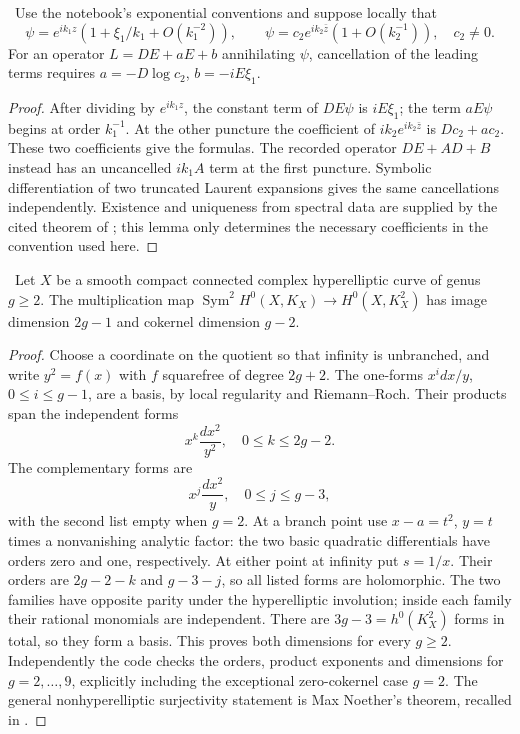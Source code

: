 \begin{lemma}\ours\
Use the notebook's exponential conventions and suppose locally that
\[
 \psi=e^{ik_1z}(1+\xi_1/k_1+O(k_1^{-2})),\qquad
 \psi=c_2e^{ik_2\bar z}(1+O(k_2^{-1})),\quad c_2\ne0.
\]
For an operator \(L=DE+aE+b\) annihilating \(\psi\), cancellation of the
leading terms requires
\(a=-D\log c_2\), \(b=-iE\xi_1\).
\end{lemma}
\begin{proof}
After dividing by \(e^{ik_1z}\), the constant term of \(DE\psi\) is
\(iE\xi_1\); the term \(aE\psi\) begins at order \(k_1^{-1}\).
At the other puncture the coefficient of \(ik_2e^{ik_2\bar z}\) is
\(Dc_2+ac_2\). These two coefficients give the formulas. The recorded
operator \(DE+A D+B\) instead has an uncancelled \(ik_1 A\) term at the first
puncture. Symbolic differentiation of two truncated Laurent expansions gives
the same cancellations independently. Existence and uniqueness from spectral
data are supplied by the cited theorem of
\citet[\S3, Lemmas 1--2]{dubrovinkrichevernovikov1976schrodinger}; this lemma
only determines the necessary coefficients in the convention used here.
\end{proof}

\begin{proposition}[The hyperelliptic defect in products of differentials]\ours\
Let \(X\) be a smooth compact connected complex hyperelliptic curve of genus \(g\ge2\).
The multiplication map
\(\operatorname{Sym}^2H^0(X,K_X)\to H^0(X,K_X^2)\) has image dimension
\(2g-1\) and cokernel dimension \(g-2\).
\end{proposition}
\begin{proof}
Choose a coordinate on the quotient so that infinity is unbranched, and write
\(y^2=f(x)\) with \(f\) squarefree of degree \(2g+2\). The one-forms
\(x^i dx/y\), \(0\le i\le g-1\), are a basis, by local regularity and
Riemann--Roch. Their products span the independent forms
\[
 x^k\frac{dx^2}{y^2},\quad 0\le k\le 2g-2.
\]
The complementary forms are
\[
 x^j\frac{dx^2}{y},\quad 0\le j\le g-3,
\]
with the second list empty when \(g=2\). At a branch point use
\(x-a=t^2\), \(y=t\) times a nonvanishing analytic factor: the two basic
quadratic differentials have orders zero and one, respectively. At either
point at infinity put \(s=1/x\). Their orders are \(2g-2-k\) and
\(g-3-j\), so all listed forms are holomorphic. The two families have opposite
parity under the hyperelliptic involution; inside each family their rational
monomials are independent. There are \(3g-3=h^0(K_X^2)\) forms in total,
so they form a basis. This proves both dimensions for every \(g\ge2\).
Independently the code checks the orders, product exponents and dimensions for
\(g=2,\ldots,9\), explicitly including the exceptional zero-cokernel case
\(g=2\). The general nonhyperelliptic surjectivity statement is Max Noether's
theorem, recalled in \citet[\S3.1]{matonevolpato2013determinantal}.
\end{proof}

